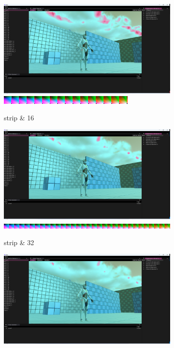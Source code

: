 \documentclass{ctexart}
\begin{document}
    \begin{figure}[!htbp]
    	\centering
    	\begin{subfigure}{0.3\textwidth}
    		\includegraphics[width=\textwidth]{screen_shot_cube_strip_2d_16_avatar.png}
    		\includegraphics[width=\textwidth]{cube_strip_2d_16_avatar.png}
    		\caption{strip \& 16}
    	\end{subfigure}
    	\begin{subfigure}{0.3\textwidth}
    		\includegraphics[width=\textwidth]{screen_shot_cube_strip_2d_32_avatar.png}
    		\includegraphics[width=\textwidth]{cube_strip_2d_32_avatar.png}
    		\caption{strip \& 32}
    	\end{subfigure}
    	\begin{subfigure}{0.3\textwidth}
    		\includegraphics[width=\textwidth]{screen_shot_cube_strip_2d_64_avatar.png}

\end{subfigure}
\end{figure}
\end{document}
